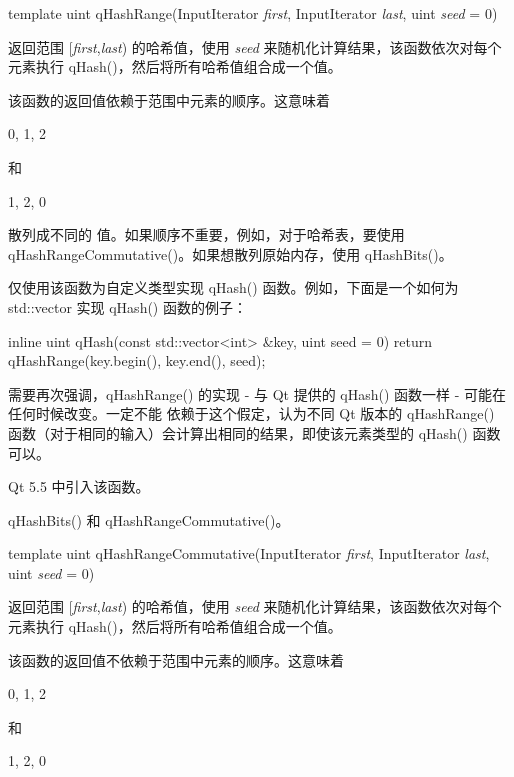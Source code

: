 template uint qHashRange(InputIterator \emph{first}, InputIterator \emph{last}, uint \emph{seed} = 0)

返回范围 [\emph{first},\emph{last}) 的哈希值，使用 \emph{seed} 来随机化计算结果，该函数依次对每个元素执行 qHash()，然后将所有哈希值组合成一个值。

该函数的返回值依赖于范围中元素的顺序。这意味着

\begin{cppcode}
{0, 1, 2}
\end{cppcode}

和

\begin{cppcode}
{1, 2, 0}
\end{cppcode}

散列成不同的 值。如果顺序不重要，例如，对于哈希表，要使用 qHashRangeCommutative()。如果想散列原始内存，使用 qHashBits()。

仅使用该函数为自定义类型实现 qHash() 函数。例如，下面是一个如何为
std::vector 实现 qHash() 函数的例子：

\begin{cppcode}
inline uint qHash(const std::vector<int> &key, uint seed = 0)
{
    return qHashRange(key.begin(), key.end(), seed);
}
\end{cppcode}

需要再次强调，qHashRange() 的实现 - 与 Qt 提供的 qHash() 函数一样 - 可能在任何时候改变。一定不能 依赖于这个假定，认为不同 Qt 版本的 qHashRange() 函数（对于相同的输入）会计算出相同的结果，即使该元素类型的 qHash() 函数可以。

Qt 5.5 中引入该函数。

\begin{seeAlso}
qHashBits() 和 qHashRangeCommutative()。
\end{seeAlso}


template uint qHashRangeCommutative(InputIterator \emph{first}, InputIterator \emph{last}, uint \emph{seed} = 0)

返回范围 [\emph{first},\emph{last}) 的哈希值，使用 \emph{seed} 来随机化计算结果，该函数依次对每个元素执行 qHash()，然后将所有哈希值组合成一个值。

该函数的返回值不依赖于范围中元素的顺序。这意味着

\begin{cppcode}
{0, 1, 2}
\end{cppcode}

和

\begin{cppcode}
{1, 2, 0}
\end{cppcode}

